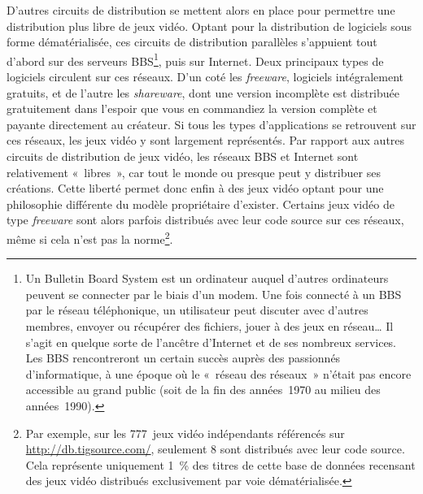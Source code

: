 \documentclass{FramateX}
\begin{document}
\begin{refsection}
D'autres circuits de distribution se mettent alors en place pour
permettre une distribution plus libre de jeux vidéo. Optant pour la
distribution de logiciels sous forme dématérialisée, ces circuits de
distribution parallèles s'appuient tout d'abord sur des serveurs
BBS\footnote{Un Bulletin Board System est un ordinateur auquel d'autres
ordinateurs peuvent se connecter par le biais d'un modem. Une fois
connecté à un BBS par le réseau téléphonique, un utilisateur peut
discuter avec d'autres membres, envoyer ou récupérer des fichiers,
jouer à des jeux en réseau… Il s'agit en quelque sorte de l'ancêtre
d'Internet et de ses nombreux services. Les BBS rencontreront un
certain succès auprès des passionnés d'informatique, à une époque où le
«~réseau des réseaux~» n'était pas encore accessible au grand public
(soit de la fin des années~1970 au milieu des années~1990).}, puis sur
Internet. Deux principaux types de logiciels circulent sur ces réseaux.
D'un coté les \textit{freeware}, logiciels intégralement gratuits, et de
l'autre les \textit{shareware}, dont une version incomplète est distribuée
gratuitement dans l'espoir que vous en commandiez la version complète
et payante directement au créateur. Si tous les types d'applications se
retrouvent sur ces réseaux, les jeux vidéo y sont largement
représentés. Par rapport aux autres circuits de distribution de jeux
vidéo, les réseaux BBS et Internet sont relativement «~libres~», car
tout le monde ou presque peut y distribuer ses créations. Cette liberté
permet donc enfin à des jeux vidéo optant pour une philosophie
différente du modèle propriétaire d'exister. Certains jeux vidéo de
type \textit{freeware} sont alors parfois distribués avec leur code
source sur ces réseaux, même si cela n'est pas la norme\footnote{Par
exemple, sur les 777~jeux vidéo indépendants référencés sur
\url{http://db.tigsource.com/}, seulement 8 sont distribués avec leur
code source. Cela représente uniquement 1~\% des titres de cette base
de données recensant des jeux vidéo distribués exclusivement par voie
dématérialisée.}. 


\end{refsection}
\end{document}
